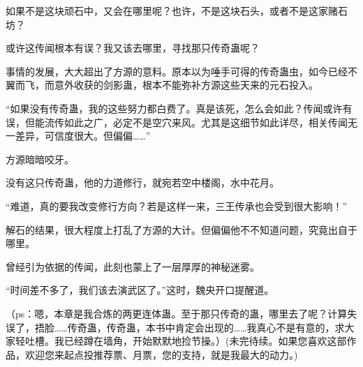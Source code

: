 \begin{this_body}
如果不是这块顽石中，又会在哪里呢？也许，不是这块石头，或者不是这家赌石坊？

或许这传闻根本有误？我又该去哪里，寻找那只传奇蛊呢？

事情的发展，大大超出了方源的意料。原本以为唾手可得的传奇蛊虫，如今已经不翼而飞，而意外收获的剑影蛊，根本不能弥补方源这些天来的元石投入。

“如果没有传奇蛊，我的这些努力都白费了。真是该死，怎么会如此？传闻或许有误，但能流传如此之广，必定不是空穴来风。尤其是这细节如此详尽，相关传闻无一差异，可信度很大。但偏偏……”

方源暗暗咬牙。

没有这只传奇蛊，他的力道修行，就宛若空中楼阁，水中花月。

“难道，真的要我改变修行方向？若是这样一来，三王传承也会受到很大影响！”

解石的结果，很大程度上打乱了方源的大计。但偏偏他不不知道问题，究竟出自于哪里。

曾经引为依据的传闻，此刻也蒙上了一层厚厚的神秘迷雾。

“时间差不多了，我们该去演武区了。”这时，魏央开口提醒道。

（ps：嗯，本章是我合炼的两更连体蛊。至于那只传奇的蛊，哪里去了呢？计算失误了，捂脸……传奇蛊，传奇蛊，本书中肯定会出现的……我真心不是有意的，求大家轻吐槽。我已经蹲在墙角，开始默默地捡节操。）(未完待续。如果您喜欢这部作品，欢迎您来起点投推荐票、月票，您的支持，就是我最大的动力。)

\end{this_body}

